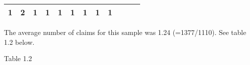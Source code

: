 \documentclass[]{book}
\newenvironment{Shaded}{\begin{snugshade}}{\end{snugshade}}
\newcommand{\KeywordTok}[1]{\textcolor[rgb]{0.13,0.29,0.53}{\textbf{#1}}}
\newcommand{\OperatorTok}[1]{\textcolor[rgb]{0.81,0.36,0.00}{\textbf{#1}}}
\newcommand{\NormalTok}[1]{#1}
\theoremstyle{definition}
\theoremstyle{definition}
\theoremstyle{definition}
\theoremstyle{remark}
\begin{document}
\begin{longtable}[]{@{}cccccccccccc@{}}
\begin{minipage}[t]{0.04\columnwidth}
1\strut
\end{minipage} & \begin{minipage}[t]{0.04\columnwidth}\centering\strut
2\strut
\end{minipage} & \begin{minipage}[t]{0.04\columnwidth}\centering\strut
1\strut
\end{minipage} & \begin{minipage}[t]{0.04\columnwidth}\centering\strut
1\strut
\end{minipage} & \begin{minipage}[t]{0.04\columnwidth}\centering\strut
1\strut
\end{minipage} & \begin{minipage}[t]{0.04\columnwidth}\centering\strut
1\strut
\end{minipage} & \begin{minipage}[t]{0.04\columnwidth}\centering\strut
1\strut
\end{minipage} & \begin{minipage}[t]{0.05\columnwidth}\centering\strut
1\strut
\end{minipage} & \begin{minipage}[t]{0.05\columnwidth}\centering\strut
1\strut
\end{minipage}\tabularnewline
\bottomrule
\end{longtable}

The average number of claims for this sample was 1.24 (=1377/1110). See
table 1.2 below.

Table 1.2

\begin{Shaded}
\end{Shaded}
\end{document}
